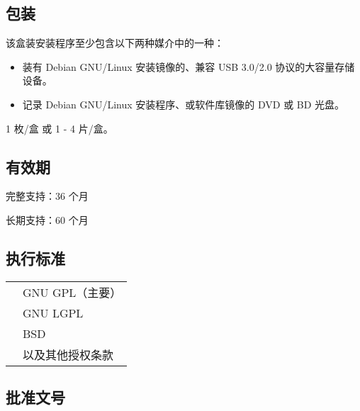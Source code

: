 \documentclass{article}
\begin{document}
\begin{multicols*}{3}
	\medskip


	\begin{tcolorbox}
	\section*{包装}
	\end{tcolorbox}

	该盒装安装程序至少包含以下两种媒介中的一种：
	\begin{itemize}[leftmargin=*]
		\setlength{\itemsep}{0pt}
		\setlength{\parskip}{0pt}
		\setlength{\parsep}{0pt}
		\item 装有 Debian GNU/Linux 安装镜像的、兼容 USB 3.0/2.0 协议的大容量存储设备。
		\item 记录 Debian GNU/Linux 安装程序、或软件库镜像的 DVD 或 BD 光盘。
	\end{itemize}

	1 枚/盒 或 1 - 4 片/盒。

	\medskip


	\begin{tcolorbox}
	\section*{有效期}
	\end{tcolorbox}

	完整支持：36 个月

	长期支持：60 个月

	\medskip


	\begin{tcolorbox}
	\section*{执行标准}
	\end{tcolorbox}
	\begin{tabularx}{\linewidth}{@{}ll@{}}
		\multirow{4}{*}{}{开源许可证：} & GNU GPL（主要）\\
		~ & GNU LGPL \\
		~ & BSD \\
		~ & 以及其他授权条款 \\
	\end{tabularx}

	\medskip


	\begin{tcolorbox}
	\section*{批准文号}
	\end{tcolorbox}


\end{multicols*}
\end{document}
